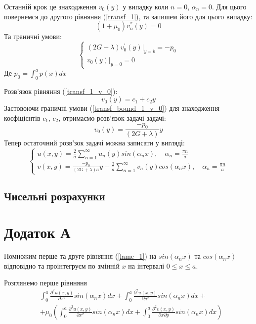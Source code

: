 \documentclass[a4paper,14pt]{extarticle}
\numberwithin{equation}{section}
\begin{document}
Останній крок це знаходження $v_0(y)$ у випадку коли $n=0$, $\alpha_n =0$.
Для цього повернемся до другого рівняння (\ref{transf_1}), та запишем його для цього випадку:
\begin{equation}\label{transf_1_v_0}
    (1 + \mu_0) v_n^{''}(y) = 0
\end{equation}
Та граничні умови:
\begin{equation}\label{transf_bound_1_v_0}
    \begin{cases}
        (2G + \lambda)v_0^{'}(y)|_{y=b} = -p_0 \\
        v_0(y)|_{y=0} = 0
    \end{cases}
\end{equation}
Де $p_0 = \int_{0}^{a}p(x)dx$

Розв'язок рівняння (\ref{transf_1_v_0}):
\begin{equation}
    v_0(y) = c_1 + c_2 y
\end{equation}
Застовоючи граничні умови (\ref{transf_bound_1_v_0}) для знаходження коєфіцієнтів $c_1$, $c_2$, отримаємо розв'язок задачі задачі:
\begin{equation}
    v_0(y) = \frac{-p_0}{(2G + \lambda)}y
\end{equation}
Тепер остаточний розв'зок задачі можна записати у вигляді:
\begin{equation}
    \begin{cases}
        u(x,y) = \frac{2}{a} \sum_{n=1}^{\infty} u_n(y) sin(\alpha_n x), \quad \alpha_n = \frac{\pi n}{a} \\
        v(x,y) = \frac{-p_0}{(2G + \lambda)a}y + \frac{2}{a} \sum_{n=1}^{\infty} v_n(y) cos(\alpha_n x), \quad \alpha_n = \frac{\pi n}{a}
    \end{cases}
\end{equation}

\subsection{Чисельні розрахунки}

\section{Додаток А}\label{ap_A_1}
Помножим перше та друге рівняння (\ref{lame_1}) на $sin(\alpha_n x)$ та $cos(\alpha_n x)$ відповідно та проінтегруєм по змінній $x$ на інтервалі $0 \le x \le a$.

Розглянемо перше рівнняня
\begin{align*}
    &\int_{0}^{a} \frac{\partial^2 u(x,y)}{\partial x^2} sin(\alpha_n x)dx + \int_{0}^{a} \frac{\partial^2 u(x,y)}{\partial y^2} sin(\alpha_n x)dx + \\ 
    & + \mu_0 \left( \int_{0}^{a} \frac{\partial^2 u(x,y)}{\partial x^2} sin(\alpha_n x)dx +  \int_{0}^{a} \frac{\partial^2 v(x,y)}{\partial x \partial y} sin(\alpha_n x) dx\right)
\end{align*}
\end{document}
